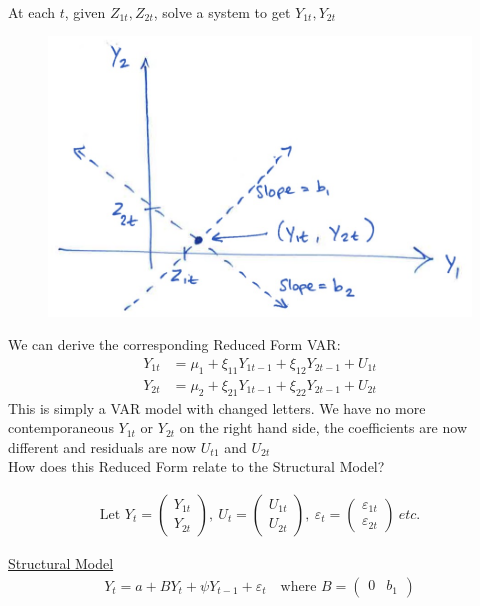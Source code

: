  \\

At each $t$, given $Z_{1t},Z_{2t}$, solve a system to get $Y_{1t}, Y_{2t} $

\begin{figure}[H]
    \centering
    \includegraphics[width=0.5\linewidth]{images/Screenshot 2024-06-08 at 09.12.16.jpg}
\end{figure}

We can derive the corresponding Reduced Form VAR:
\begin{align*}
    Y_{1t} &= \mu_1 + \xi_{11} Y_{1t-1} + \xi_{12} Y_{2t-1} + U_{1t}\\
    Y_{2t} &= \mu_2 + \xi_{21} Y_{1t-1} + \xi_{22} Y_{2t-1} + U_{2t}
\end{align*}
This is simply a VAR model with changed letters. We have no more contemporaneous $Y_{1t}$ or $Y_{2t}$ on the right hand side, the coefficients are now different and residuals are now $U_{t1}$ and $U_{2t}$\\

How does this Reduced Form relate to the Structural Model? 

\begin{align*}
    \text{Let } Y_t = \begin{pmatrix}
        Y_{1t} \\
        Y_{2t}
    \end{pmatrix},\ U_t = \begin{pmatrix}
        U_{1t} \\
        U_{2t}
    \end{pmatrix},\  \varepsilon_t = \begin{pmatrix}
        \varepsilon_{1t}\\
        \varepsilon_{2t}
    \end{pmatrix} \ etc.
\end{align*}

\underline{Structural Model}
\begin{align*}
    Y_t = a + BY_t + \psi Y_{t-1} + \varepsilon_t \quad \text{where } B=\begin{pmatrix}
        0 & b_1  
    \end{pmatrix}
\end{align*}

